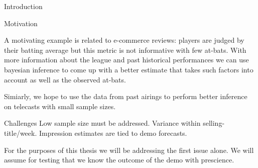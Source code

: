 \begin{chapter}{Introduction}
\begin{section}{Motivation}

  A motivating example is related to e-commerce reviews: players are judged by their
  batting average but this metric is not informative with few at-bats. With more
  information about the league and past historical performances we can use bayesian
  inference to come up with a better estimate that takes such factors into account
  as well as the observed at-bats.

  Simiarly, we hope to use the data from past airings to perform better inference
  on telecasts with small sample sizes.
\end{section}

\begin{section}{Challenges}
  Low sample size must be addressed.
  Variance within selling-title/week.
  Impression estimates are tied to demo forecasts.

  For the purposes of this thesis we will be addressing the first issue alone.
  We will assume for testing that we know the outcome of the demo with prescience.
\end{section}

\end{chapter}